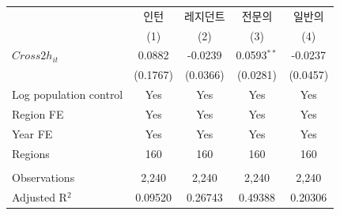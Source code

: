 \begingroup
\centering
\begin{tabular}{lcccc}
   \toprule
                          & 인턴     & 레지던트 & 전문의        & 일반의 \\   
                          & (1)      & (2)      & (3)           & (4)\\  
   \midrule 
   $Cross2h_{it}$         & 0.0882   & -0.0239  & 0.0593$^{**}$ & -0.0237\\   
                          & (0.1767) & (0.0366) & (0.0281)      & (0.0457)\\   
   Log population control & Yes      & Yes      & Yes           & Yes\\  
   Region FE              & Yes      & Yes      & Yes           & Yes\\  
   Year FE                & Yes      & Yes      & Yes           & Yes\\  
   Regions                & 160      & 160      & 160           & 160\\  
    \\
   Observations           & 2,240    & 2,240    & 2,240         & 2,240\\  
   Adjusted R$^2$         & 0.09520  & 0.26743  & 0.49388       & 0.20306\\  
   \bottomrule
\end{tabular}
\par\endgroup
